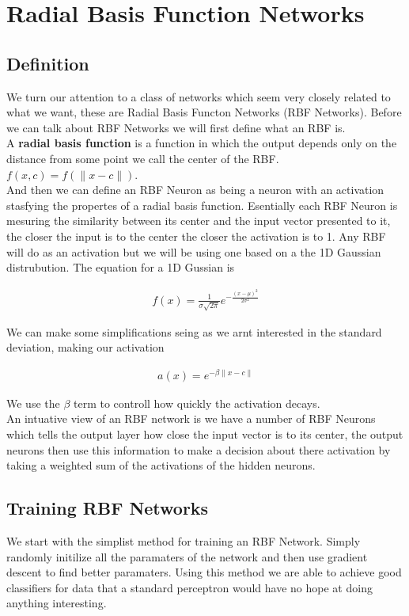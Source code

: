 \documentclass{article}
\theoremstyle{definition}
\begin{document}
\newpage

\section{Radial Basis Function Networks}
\subsection{Definition}
We turn our attention to a class of networks which seem very closely related to what we want, these are Radial Basis Functon Networks (RBF Networks). Before we can talk about RBF Networks we will first define what an RBF is.\\

A \textbf{radial basis function} is a function in which the output depends only on the distance from some point we call the center of the RBF. $f(x, c) = f(\lVert x - c \lVert)$.\\

And then we can define an RBF Neuron as being a neuron with an activation stasfying the propertes of a radial basis function. Esentially each RBF Neuron is mesuring the similarity between its center and the input vector presented to it, the closer the input is to the center the closer the activation is to 1. Any RBF will do as an activation but we will be using one based on a the 1D Gaussian distrubution. The equation for a 1D Gussian is 

\begin{align*}
f(x) = \frac{1}{\sigma \sqrt{2 \pi}} e^{-\frac{(x-\mu)^2}{2\sigma^2}}
\end{align*}

We can make some simplifications seing as we arnt interested in the standard deviation, making our activation

\begin{align}
a(x) = e^{-\beta \lVert x - c \lVert}
\end{align}

We use the $\beta$ term to controll how quickly the activation decays.\\

An intuative view of an RBF network is we have a number of RBF Neurons which tells the output layer how close the input vector is to its center, the output neurons then use this information to make a decision about there activation by taking a weighted sum of the activations of the hidden neurons.

\subsection{Training RBF Networks}
We start with the simplist method for training an RBF Network. Simply randomly initilize all the paramaters of the network and then use gradient descent to find better paramaters. Using this method we are able to achieve good classifiers for data that a standard perceptron would have no hope at doing anything interesting. 
\end{document}
